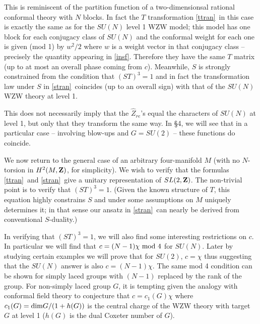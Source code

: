 \documentclass[12pt]{article}
\numberwithin{equation}{section}
\begin{document}
This is reminiscent of the partition function
of a two-dimensionsal
rational conformal theory with $N$ blocks.  In fact the $T$
transformation \eqref{ttran}\ in this case
is exactly the same as for the $SU(N)$ level
1 WZW model; this model has
one block for each conjugacy class of $SU(N)$ and the conformal weight
for each one is given (mod 1) by $w^2/2$ where $w$ is a weight vector
in that conjugacy class -- precisely the quantity
appearing in \eqref{insf}.  Therefore they
have the same $T$ matrix (up to at most an overall phase
coming from $c$).  Meanwhile, $S$
is
strongly constrained from the condition that $(ST)^3=1$
and in fact the transformation law under $S$
in \eqref{stran}\ coincides
(up to an overall sign) with that of the $SU(N)$ WZW theory at level 1.

This does not necessarily imply that the $\hat Z_{re}$'s
equal the characters of $SU(N)$ at level 1,
but only that they transform the same way.
In \S4, we will see that in a particular case -- involving
blow-ups and $G=SU(2)$ -- these functions do coincide.

\bigskip
{}

We now return to the general case of an arbitrary four-manifold $M$
(with no $N$-torsion in $H^2(M,{\bf Z})$, for simplicity).
We wish to verify that the formulas \eqref{ttran}\ and \eqref{stran}\ give
a unitary representation of $SL(2,{\bf Z})$.
The non-trivial point is to verify that $(ST)^3=1$.
(Given the known structure of $T$, this equation highly constrains
  $S$ and under some assumptions on $M$ uniquely determines it; in
  that sense our ansatz in \eqref{stran}\ can nearly be derived from
  conventional
$S$-duality.)

In verifying that $(ST)^3=1$, we will also find some interesting
restrictions on $c$.
In particular we will find that $c=(N-1)\chi \  {\rm mod}\ 4$
for $ SU(N)$.
Later by studying certain examples we will prove
that for $SU(2)$, $c=\chi$ thus suggesting that the $SU(N)$
answer is also $c=(N-1)\chi$.  The same mod 4 condition can
be shown for simply laced groups with $(N-1)$ replaced
by the rank of the group.  For non-simply laced group $G$,
it is tempting given the analogy with  conformal
field theory to conjecture that $c=c_1(G)\chi $ where
$c_1(G)={\rm dim}G/(1+h(G))$
is the central charge of the WZW
theory with target $G$  at level 1 ($h(G)$ is the dual Coxeter number of  $G$).
\end{document}
